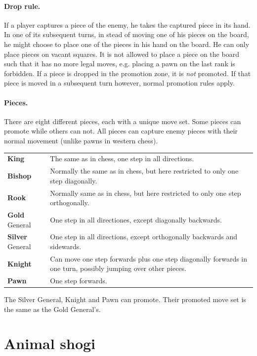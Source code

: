 \documentclass{article}
\begin{document}
{\paragraph{Drop rule.} If a player captures a piece of the enemy, he takes the captured piece in its hand. In one of its subsequent turns, in stead of moving one of his
pieces on the board, he might choose to place one of the pieces in his hand on the board. He can only place pieces on vacant squares. It is not allowed to place a piece
on the board such that it has no more legal moves, e.g. placing a pawn on the last rank is forbidden. If a piece is dropped in the promotion zone, it is \emph{not} promoted.
If that piece is moved in a subsequent turn however, normal promotion rules apply.

\paragraph{Pieces.} There are eight different pieces, each with a unique move set. Some pieces can promote while others can not. All pieces can capture enemy pieces with their normal movement
(unlike pawns in western chess).\\
\begin{tabular}{l l}
\textbf{King} & The same as in chess, one step in all directions.\\
\textbf{Bishop} & Normally the same as in chess, but here restricted to only one step diagonally.\\
\textbf{Rook} & Normally same as in chess, but here restricted to only one step orthogonally.\\
\textbf{Gold} General & One step in all directiones, except diagonally backwards.\\
\textbf{Silver} General & One step in all directions, except orthogonally backwards and sidewards.\\
\textbf{Knight} & Can move one step forwards plus one step diagonally forwards in one turn, possibly jumping over other pieces.\\
\textbf{Pawn} & One step forwards.\\
\end{tabular}
The Silver General, Knight and Pawn can promote. Their promoted move set is the same as the Gold General's.

\section{Animal shogi}
\label{dobutsu}

}
\end{document}
